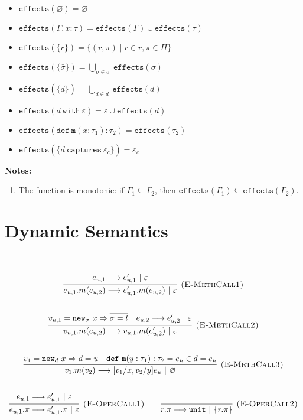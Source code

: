 \documentclass{llncs}
\newcommand{\keywadj}[1]{\mathtt{#1}}
\newcommand{\keyw}[1]{\keywadj{#1}~}
\newcommand{\kwa}[1]{\keywadj{ #1 }}
\newcommand{\newd}[0]{
	\keywadj{new}_d~x \Rightarrow \overline{d = u}
}
\newcommand{\newsig}[0]{
	\keywadj{new}_\sigma~x \Rightarrow \overline{\sigma = l}
}
\begin{document}
\begin{itemize}
	\item $\keywadj{effects}(\varnothing) = \varnothing$
	\item $\keywadj{effects}(\Gamma, x : \tau) = \keywadj{effects}(\Gamma) \cup \keywadj{effects}(\tau)$
	\item $\keywadj{effects}(\{\bar r\}) = \{ (r, \pi) \mid r \in \bar r, \pi \in \Pi \}$
	\item $\keywadj{effects}(\{\bar \sigma\}) = \bigcup_{\sigma \in \bar \sigma}~\keywadj{effects}(\sigma)$
	\item $\keywadj{effects}(\{\bar d\}) = \bigcup_{d \in \bar d}~\keywadj{effects}(d)$
	\item $\keywadj{effects}(d~\keyw{with} \varepsilon) = \varepsilon \cup \keywadj{effects}(d)$
	\item $\keywadj{effects}(\keywadj{def~m}(x : \tau_1) : \tau_2) = \keywadj{effects}(\tau_2)$
	\item $\keywadj{effects}(\{\bar d ~\keyw{captures} \varepsilon_c\}) = \varepsilon_c$
\end{itemize}

\noindent \textbf{Notes:}

\begin{enumerate}
	\item The function is monotonic: if $\Gamma_1 \subseteq \Gamma_2$, then $\kwa{effects}(\Gamma_1) \subseteq \kwa{effects}(\Gamma_2)$.
\end{enumerate}


\section{Dynamic Semantics}

~\\
\noindent
{}

\[
\begin{array}{c}

	\infer[\textsc{(E-MethCall1)}]
		{e_{u, 1}.m(e_{u, 2}) \longrightarrow e_{u, 1}'.m(e_{u, 2})~|~\varepsilon}
		{e_{u, 1} \longrightarrow e_{u, 1}'~|~\varepsilon} \\[5ex]

	\infer[\textsc{(E-MethCall2)}]
		{v_{u, 1}.m(e_{u, 2}) \longrightarrow v_{u, 1}.m(e_{u, 2}')~|~\varepsilon}
		{v_{u, 1} = \newsig & e_{u, 2} \longrightarrow e_{u, 2}'~|~\varepsilon} \\[5ex]
		
	\infer[\textsc{(E-MethCall3)}]
		{v_1.m(v_2)
			\longrightarrow
		 [v_1/x, v_2/y]e_u~|~\varnothing}
  		{v_1 = \newd & \keywadj{def~m}(y: \tau_1) : \tau_2 = e_u \in \overline {d = e_u}} \\[5ex]

	\infer[\textsc{(E-OperCall1)}]
		{e_{u, 1}.\pi
			\longrightarrow
		 e_{u, 1}'.\pi~|~\varepsilon}
		{e_{u, 1} \longrightarrow e_{u, 1}'~|~\varepsilon}
~~~~~~

			\infer[\textsc{(E-OperCall2)}]
		{r.\pi
			\longrightarrow
		 \keywadj{unit}~|~\{r.\pi\}}
		{} \\[5ex]
			
\end{array}
\]
\noindent
{}
\end{document}
